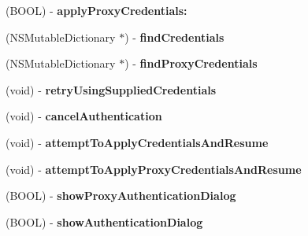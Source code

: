 \begin{DoxyCompactItemize}
\item 
\hypertarget{interface_a_s_i_h_t_t_p_request_a53e09e81268eb7230b4b5498ed2eb7d1}{
(BOOL) -\/ {\bfseries applyProxyCredentials:}}
\label{interface_a_s_i_h_t_t_p_request_a53e09e81268eb7230b4b5498ed2eb7d1}

\item 
\hypertarget{interface_a_s_i_h_t_t_p_request_af337cbd50189506479260c6069ca2ded}{
(NSMutableDictionary $\ast$) -\/ {\bfseries findCredentials}}
\label{interface_a_s_i_h_t_t_p_request_af337cbd50189506479260c6069ca2ded}

\item 
\hypertarget{interface_a_s_i_h_t_t_p_request_aee0699cfb5ba5749a1461dfa56440121}{
(NSMutableDictionary $\ast$) -\/ {\bfseries findProxyCredentials}}
\label{interface_a_s_i_h_t_t_p_request_aee0699cfb5ba5749a1461dfa56440121}

\item 
\hypertarget{interface_a_s_i_h_t_t_p_request_aad1efa3b1bc64006cc033bd0d4eee7cc}{
(void) -\/ {\bfseries retryUsingSuppliedCredentials}}
\label{interface_a_s_i_h_t_t_p_request_aad1efa3b1bc64006cc033bd0d4eee7cc}

\item 
\hypertarget{interface_a_s_i_h_t_t_p_request_a25d3d77f917c5f8b9956f6a45022dae2}{
(void) -\/ {\bfseries cancelAuthentication}}
\label{interface_a_s_i_h_t_t_p_request_a25d3d77f917c5f8b9956f6a45022dae2}

\item 
\hypertarget{interface_a_s_i_h_t_t_p_request_ad3da0a488faf41101bbf73a8071456e8}{
(void) -\/ {\bfseries attemptToApplyCredentialsAndResume}}
\label{interface_a_s_i_h_t_t_p_request_ad3da0a488faf41101bbf73a8071456e8}

\item 
\hypertarget{interface_a_s_i_h_t_t_p_request_a03ce363e92c2d5dbe7229f021b0230a5}{
(void) -\/ {\bfseries attemptToApplyProxyCredentialsAndResume}}
\label{interface_a_s_i_h_t_t_p_request_a03ce363e92c2d5dbe7229f021b0230a5}

\item 
\hypertarget{interface_a_s_i_h_t_t_p_request_ad9c4b7b0abc790e74806860c6d7a7a5b}{
(BOOL) -\/ {\bfseries showProxyAuthenticationDialog}}
\label{interface_a_s_i_h_t_t_p_request_ad9c4b7b0abc790e74806860c6d7a7a5b}

\item 
\hypertarget{interface_a_s_i_h_t_t_p_request_a64d812546f152b29ddd614938ffa5539}{
(BOOL) -\/ {\bfseries showAuthenticationDialog}}
\label{interface_a_s_i_h_t_t_p_request_a64d812546f152b29ddd614938ffa5539}


\end{DoxyCompactItemize}
